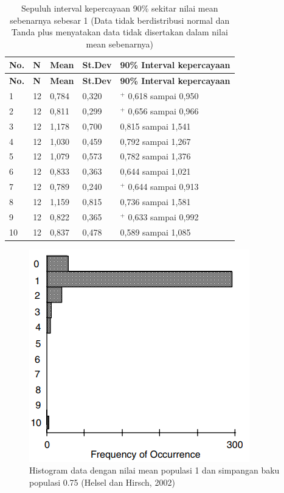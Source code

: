 \documentclass[]{book}
\begin{document}
\begin{longtable}[]{@{}lllll@{}}
\caption{\label{tab:iie2} Sepuluh interval kepercayaan 90\% sekitar nilai
mean sebenarnya sebesar 1 (Data tidak berdistribusi normal dan Tanda
plus menyatakan data tidak disertakan dalam nilai mean
sebenarnya)}\tabularnewline
\toprule
\textbf{No.} & \textbf{N} & \textbf{Mean} & \textbf{St.Dev} &
\textbf{90\% Interval kepercayaan}\tabularnewline
\midrule
\endfirsthead
\toprule
\textbf{No.} & \textbf{N} & \textbf{Mean} & \textbf{St.Dev} &
\textbf{90\% Interval kepercayaan}\tabularnewline
\midrule
\endhead
1 & 12 & 0,784 & 0,320 & \(^+\) 0,618 sampai 0,950\tabularnewline
2 & 12 & 0,811 & 0,299 & \(^+\) 0,656 sampai 0,966\tabularnewline
3 & 12 & 1,178 & 0,700 & 0,815 sampai 1,541\tabularnewline
4 & 12 & 1,030 & 0,459 & 0,792 sampai 1,267\tabularnewline
5 & 12 & 1,079 & 0,573 & 0,782 sampai 1,376\tabularnewline
6 & 12 & 0,833 & 0,363 & 0,644 sampai 1,021\tabularnewline
7 & 12 & 0,789 & 0,240 & \(^+\) 0,644 sampai 0,913\tabularnewline
8 & 12 & 1,159 & 0,815 & 0,736 sampai 1,581\tabularnewline
9 & 12 & 0,822 & 0,365 & \(^+\) 0,633 sampai 0,992\tabularnewline
10 & 12 & 0,837 & 0,478 & 0,589 sampai 1,085\tabularnewline
\bottomrule
\end{longtable}

\begin{figure}

{\centering \includegraphics[width=0.7\linewidth]{iiedata} 

}

\caption{Histogram data dengan nilai mean populasi 1 dan simpangan baku populasi 0.75 (Helsel dan Hirsch, 2002)}\label{fig:iiedata}
\end{figure}
\end{document}
